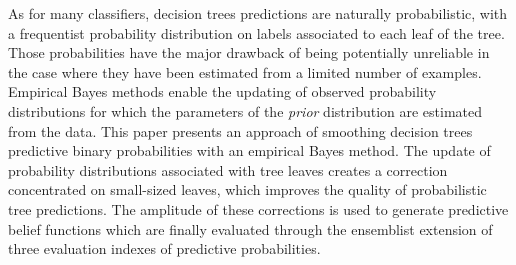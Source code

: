 
As for many classifiers, decision trees predictions are naturally probabilistic, with a frequentist probability distribution on labels associated to each leaf of the tree. 
	Those probabilities have the major drawback of being potentially unreliable in the case where they have been estimated from a limited number of examples.
	Empirical Bayes methods enable the updating of observed probability distributions for which the parameters of the \textit{prior} distribution are estimated from the data. 
	This paper presents an approach of smoothing decision trees predictive binary probabilities with an empirical Bayes method. 
	The update of probability distributions associated with tree leaves creates a correction concentrated on small-sized leaves, which improves the quality of probabilistic tree predictions.
	The amplitude of these corrections is used to generate predictive belief functions which are finally evaluated through the ensemblist extension of three evaluation indexes of predictive probabilities.


